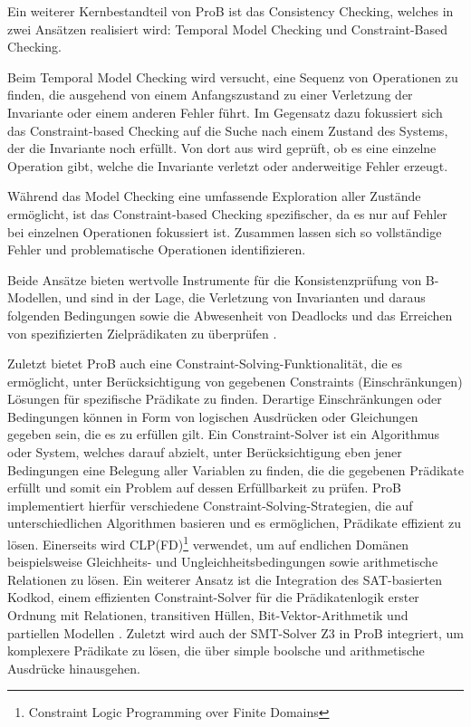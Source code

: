 Ein weiterer Kernbestandteil von ProB ist das Consistency Checking, welches in zwei Ansätzen realisiert wird: Temporal Model Checking und Constraint-Based Checking.

Beim Temporal Model Checking wird versucht, eine Sequenz von Operationen zu finden, die ausgehend von einem Anfangszustand
zu einer Verletzung der Invariante oder einem anderen Fehler führt.
Im Gegensatz dazu fokussiert sich das Constraint-based Checking auf die Suche nach einem Zustand des Systems,
der die Invariante noch erfüllt. Von dort aus wird geprüft, ob es eine einzelne Operation gibt,
welche die Invariante verletzt oder anderweitige Fehler erzeugt.

Während das Model Checking eine umfassende Exploration aller Zustände ermöglicht, ist das Constraint-based Checking spezifischer,
da es nur auf Fehler bei einzelnen Operationen fokussiert ist.
Zusammen lassen sich so vollständige Fehler und problematische Operationen identifizieren.

Beide Ansätze bieten wertvolle Instrumente für die Konsistenzprüfung von B-Modellen, und sind in der Lage, die Verletzung von Invarianten und daraus folgenden Bedingungen sowie
die Abwesenheit von Deadlocks und das Erreichen von spezifizierten Zielprädikaten zu überprüfen \cite{leuschel2008prob}.

Zuletzt bietet ProB auch eine Constraint-Solving-Funktionalität, die es ermöglicht, unter Berücksichtigung von gegebenen Constraints (Einschränkungen) Lösungen für spezifische Prädikate zu finden.
Derartige Einschränkungen oder Bedingungen können in Form von logischen Ausdrücken oder Gleichungen gegeben sein, die es zu erfüllen gilt.
Ein Constraint-Solver ist ein Algorithmus oder System, welches darauf abzielt, unter Berücksichtigung eben jener Bedingungen eine Belegung aller Variablen zu finden, die die gegebenen Prädikate erfüllt
und somit ein Problem auf dessen Erfüllbarkeit zu prüfen.
ProB implementiert hierfür verschiedene Constraint-Solving-Strategien, die auf unterschiedlichen Algorithmen basieren und es ermöglichen, Prädikate effizient zu lösen.
Einerseits wird CLP(FD)\footnote{Constraint Logic Programming over Finite Domains} verwendet, um auf endlichen Domänen beispielsweise Gleichheits- und Ungleichheitsbedingungen sowie arithmetische Relationen zu lösen.
Ein weiterer Ansatz ist die Integration des SAT-basierten Kodkod,
einem effizienten Constraint-Solver für die Prädikatenlogik erster Ordnung mit Relationen, transitiven Hüllen, Bit-Vektor-Arithmetik und partiellen Modellen \cite{torlak2007kodkod}.
Zuletzt wird auch der SMT-Solver Z3 in ProB integriert, um komplexere Prädikate zu lösen, die über simple boolsche und arithmetische Ausdrücke hinausgehen.

